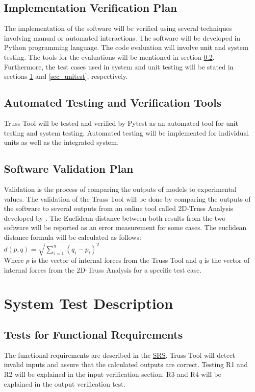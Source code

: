 \documentclass[12pt, titlepage]{article}
\begin{document}
\subsection{Implementation Verification Plan} \label{Sec_implementation}
The implementation of the software will be verified using several techniques involving manual or automated interactions. The software will be developed in Python programming language. The code evaluation will involve unit and system testing. The tools for the
evaluations will be mentioned in section \ref{sec_automat}. Furthermore, the test cases used in system and unit testing will be stated in sections \ref{sec_systest} and \ref{sec_unitest}, respectively.

\subsection{Automated Testing and Verification Tools} \label{sec_automat}
Truss Tool will be tested and verified by Pytest as an automated tool for unit testing and system testing. Automated testing will be implemented for individual units as well as the integrated system.

\subsection{Software Validation Plan}
 Validation is the process of comparing the outputs of models to experimental values. The validation of the Truss Tool will be done by comparing the outputs of the software to several outputs from an online tool called 2D-Truss Analysis developed by \cite{valdivia}. The Euclidean distance between both results from the two software will be reported as an error measurement for some cases. The euclidean distance formula will be calculated as follows:\\
\newline
$d\left( p,q\right)   = \sqrt {\sum _{i=1}^{n}  \left( q_{i}-p_{i}\right)^2 } $ \\
\newline
Where $p$ is the vector of internal forces from the Truss Tool and $q$ is the vector of internal forces from the 2D-Truss Analysis for a specific test case. 

\section{System Test Description} \label{sec_systest}
	
\subsection{Tests for Functional Requirements}
The functional requirements are described in the \href{https://github.com/Maryamvalian/project741/blob/main/docs/SRS/SRS.pdf}{SRS}. Truss Tool will detect invalid inputs and assure that the calculated outputs are correct. Testing R1 and R2 will be explained in the input verification section. R3 and R4 will be explained in the output verification test. 
\end{document}
